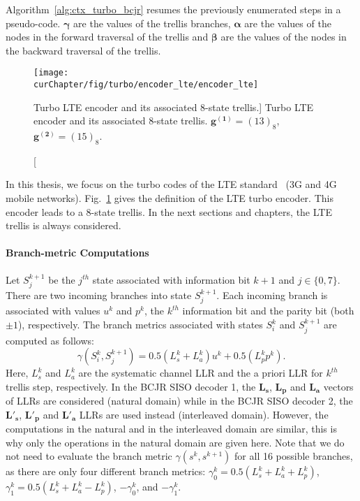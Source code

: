 Algorithm~\ref{alg:ctx_turbo_bcjr} resumes the previously enumerated steps in
a pseudo-code. $\bm{\gamma}$ are the values of the trellis branches,
$\bm{\alpha}$ are the values of the nodes in the forward traversal of the
trellis and $\bm{\beta}$ are the values of the nodes in the backward traversal
of the trellis.

\begin{figure}[htp]
  \centering
  \texttt{[image: \\curChapter/fig/turbo/encoder\_lte/encoder\_lte]}
  \caption
    [Turbo LTE encoder and its associated 8-state trellis.]
    {Turbo LTE encoder and its associated 8-state trellis.
     $\bm{g^{(1)}} = (13)_8$, $\bm{g^{(2)}} = (15)_8$.}
  \label{fig:ctx_turbo_encoder_lte}
\end{figure}

In this thesis, we focus on the turbo codes of the LTE standard~\cite{ETSI2013}
(3G and 4G mobile networks). Fig.~\ref{fig:ctx_turbo_encoder_lte} gives the
definition of the LTE turbo encoder. This encoder leads to a 8-state trellis. In
the next sections and chapters, the LTE trellis is always considered.

\paragraph{Branch-metric Computations}

Let $S_j^{k+1}$ be the $j^{th}$ state associated with information bit $k+1$ and
$j \in \{0,7\}$. There are two incoming branches into state $S_j^{k+1}$. Each
incoming branch is associated with values $u^k$ and $p^k$, the $k^{th}$
information bit and the parity bit (both $\pm1$), respectively. The branch
metrics associated with states $S_i^k$ and $S_j^{k+1}$ are computed as follows:
\begin{equation}
\label{eq:ctx_turbo_gamma}
 \gamma(S_i^k, S_j^{k+1}) = 0.5(L_{s}^k + L_a^k)u^k + 0.5(L_p^k p^k).
\end{equation}
Here, $L_{s}^k$ and $L_a^k$ are the systematic channel LLR and the a priori
LLR for $k^{th}$ trellis step, respectively.
In the BCJR SISO decoder 1, the $\bm{L_{s}}$, $\bm{L_{p}}$ and $\bm{L_{a}}$
vectors of LLRs are considered (natural domain) while in the BCJR SISO decoder
2, the $\bm{L'_{s}}$, $\bm{L'_{p}}$ and $\bm{L'_{a}}$ LLRs are used instead
(interleaved domain). However, the computations in the natural and in the
interleaved domain are similar, this is why only the operations in the natural
domain are given here. Note that we do not need to evaluate the branch metric
$\gamma(s^k , s^{k+1})$ for all 16 possible branches, as there are only four
different branch metrics:
$\gamma^k_0 = 0.5(L_{s}^k + L_a^k + L_p^k)$,
$\gamma^k_1 = 0.5(L_{s}^k + L_a^k - L_p^k)$, $-\gamma^k_0$, and $-\gamma^k_1$.

